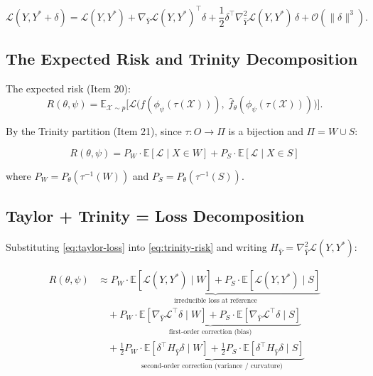 \documentclass[11pt,a4paper]{article}
\newcommand{\E}{\mathbb{E}}
\newcommand{\calL}{\mathcal{L}}
\newcommand{\calX}{\mathcal{X}}
\newcommand{\calO}{\mathcal{O}}
\begin{document}
\begin{equation}
\calL(Y, Y^* + \delta) = \calL(Y, Y^*) + \nabla_{\hat{Y}} \calL(Y, Y^*)^\top \delta + \frac{1}{2}\delta^\top \nabla^2_{\hat{Y}} \calL(Y, Y^*) \, \delta + \calO(\|\delta\|^3).
\label{eq:taylor-loss}
\end{equation}

\subsection{The Expected Risk and Trinity Decomposition}

The expected risk (Item 20):
\begin{equation}
R(\theta, \psi) = \E_{\calX \sim p}\big[\calL\big(f(\phi_\psi(\tau(\calX))),\; \hat{f}_\theta(\phi_\psi(\tau(\calX)))\big)\big].
\label{eq:risk}
\end{equation}

By the Trinity partition (Item 21), since $\tau : O \to \Pi$ is a bijection and $\Pi = W \cup S$:

\begin{equation}
\boxed{
R(\theta, \psi) = P_W \cdot \E[\calL \mid X \in W] + P_S \cdot \E[\calL \mid X \in S]
}
\label{eq:trinity-risk}
\end{equation}

where $P_W = P_\theta(\tau^{-1}(W))$ and $P_S = P_\theta(\tau^{-1}(S))$.

\subsection{Taylor + Trinity = Loss Decomposition}

Substituting \eqref{eq:taylor-loss} into \eqref{eq:trinity-risk} and writing $H_{\hat{Y}} = \nabla^2_{\hat{Y}}\calL(Y, Y^*)$:

\begin{keyresult}
\begin{align}
R(\theta, \psi) &\approx \underbrace{P_W \cdot \E[\calL(Y, Y^*) \mid W] + P_S \cdot \E[\calL(Y, Y^*) \mid S]}_{\text{irreducible loss at reference}} \nonumber \\[0.5em]
&\quad + \underbrace{P_W \cdot \E[\nabla_{\hat{Y}}\calL^\top \delta \mid W] + P_S \cdot \E[\nabla_{\hat{Y}}\calL^\top \delta \mid S]}_{\text{first-order correction (bias)}} \label{eq:trinity-taylor} \\[0.5em]
&\quad + \underbrace{\tfrac{1}{2}P_W \cdot \E[\delta^\top H_{\hat{Y}} \delta \mid W] + \tfrac{1}{2}P_S \cdot \E[\delta^\top H_{\hat{Y}} \delta \mid S]}_{\text{second-order correction (variance / curvature)}} \nonumber
\end{align}
\end{keyresult}
\end{document}
